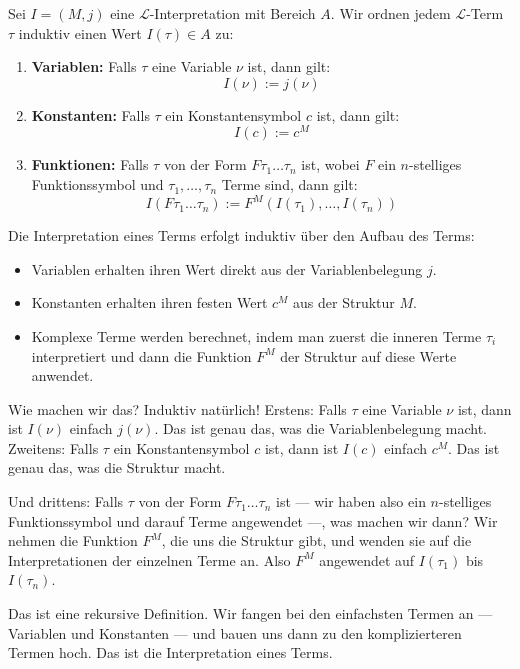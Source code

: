 \begin{math-stroke}
Sei $I = (M, j)$ eine $\mathcal{L}$-Interpretation mit Bereich $A$. Wir ordnen jedem $\mathcal{L}$-Term $\tau$ induktiv einen Wert $I(\tau) \in A$ zu:
\begin{enumerate}[label=\textbf{(\arabic*)}]
    \item \textbf{Variablen:} Falls $\tau$ eine Variable $\nu$ ist, dann gilt:
    \[ I(\nu) := j(\nu) \]
    \item \textbf{Konstanten:} Falls $\tau$ ein Konstantensymbol $c$ ist, dann gilt:
    \[ I(c) := c^M \]
    \item \textbf{Funktionen:} Falls $\tau$ von der Form $F \tau_1 \dots \tau_n$ ist, wobei $F$ ein $n$-stelliges Funktionssymbol und $\tau_1, \dots, \tau_n$ Terme sind, dann gilt:
    \[ I(F \tau_1 \dots \tau_n) := F^M(I(\tau_1), \dots, I(\tau_n)) \]
\end{enumerate}

\begin{explanation-of-steps}
Die Interpretation eines Terms erfolgt induktiv über den Aufbau des Terms:
\begin{itemize}
    \item Variablen erhalten ihren Wert direkt aus der Variablenbelegung $j$.
    \item Konstanten erhalten ihren festen Wert $c^M$ aus der Struktur $M$.
    \item Komplexe Terme werden berechnet, indem man zuerst die inneren Terme $\tau_i$ interpretiert und dann die Funktion $F^M$ der Struktur auf diese Werte anwendet.
\end{itemize}
\end{explanation-of-steps}
\end{math-stroke}

\begin{spoken-clean}[00:58:20 - 01:01:05]
Wie machen wir das? Induktiv natürlich! Erstens: Falls $\tau$ eine Variable $\nu$ ist, dann ist $I(\nu)$ einfach $j(\nu)$. Das ist genau das, was die Variablenbelegung macht. Zweitens: Falls $\tau$ ein Konstantensymbol $c$ ist, dann ist $I(c)$ einfach $c^M$. Das ist genau das, was die Struktur macht.

Und drittens: Falls $\tau$ von der Form $F \tau_1 \dots \tau_n$ ist --- wir haben also ein $n$-stelliges Funktionssymbol und darauf Terme angewendet ---, was machen wir dann? Wir nehmen die Funktion $F^M$, die uns die Struktur gibt, und wenden sie auf die Interpretationen der einzelnen Terme an. Also $F^M$ angewendet auf $I(\tau_1)$ bis $I(\tau_n)$.

Das ist eine rekursive Definition. Wir fangen bei den einfachsten Termen an --- Variablen und Konstanten --- und bauen uns dann zu den komplizierteren Termen hoch. Das ist die Interpretation eines Terms.
\end{spoken-clean}

